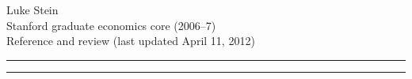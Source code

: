 \documentclass[8pt,letterpaper, landscape]{extarticle} %
\begin{document}
\noindent Luke Stein \\
Stanford graduate economics core (2006--7) \\
Reference and review (last updated April 11, 2012)
\hrule
\setlength\columnseprule{.4pt} %
\begin{multicols}{4}
\tableofcontents
\end{multicols}
\hrule %
\setlength\columnseprule{0pt} %
\end{document}
